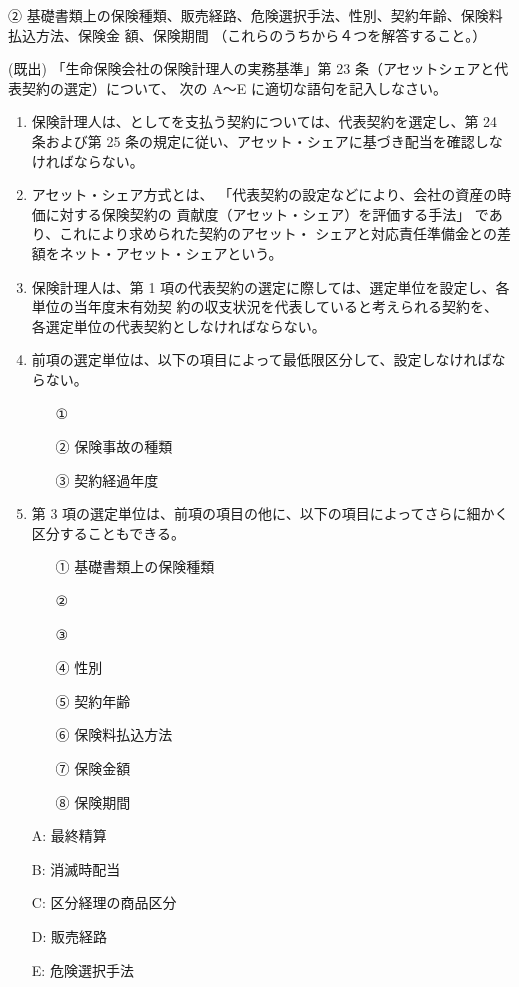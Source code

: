 \documentclass[report,gutter=10mm,fore-edge=10mm,uplatex,dvipdfmx]{jlreq}
\begin{document}
② 基礎書類上の保険種類、販売経路、危険選択手法、性別、契約年齢、保険料払込方法、保険金
額、保険期間 （これらのうちから４つを解答すること。）

 (既出)
「生命保険会社の保険計理人の実務基準」第 23 条（アセットシェアと代表契約の選定）について、
次の A～E に適切な語句を記入しなさい。


\begin{enumerate}
 \item 保険計理人は、としてを支払う契約については、代表契約を選定し、第 24 条および第 25 条の規定に従い、アセット・シェアに基づき配当を確認しなければならない。
 \item 
アセット・シェア方式とは、
「代表契約の設定などにより、会社の資産の時価に対する保険契約の
貢献度（アセット・シェア）を評価する手法」 であり、これにより求められた契約のアセット・
シェアと対応責任準備金との差額をネット・アセット・シェアという。
 \item 
保険計理人は、第 1 項の代表契約の選定に際しては、選定単位を設定し、各単位の当年度末有効契
約の収支状況を代表していると考えられる契約を、各選定単位の代表契約としなければならない。
 \item 
前項の選定単位は、以下の項目によって最低限区分して、設定しなければならない。
\begin{itemize}
 \item [①] 
 \item [②] 保険事故の種類
 \item [③] 契約経過年度
\end{itemize}
 \item 
第 3 項の選定単位は、前項の項目の他に、以下の項目によってさらに細かく区分することもできる。
\begin{itemize}
 \item [①]  基礎書類上の保険種類
 \item [②] 
\item [③] 
\item [④]  性別
\item [⑤]  契約年齢
\item [⑥]  保険料払込方法
\item [⑦]  保険金額
\item [⑧]  保険期間
\end{itemize}
\end{enumerate}
\answer{}

\begin{itemize}
\item [A: ] 最終精算
\item [B: ] 消滅時配当
\item [C: ] 区分経理の商品区分
\item [D: ] 販売経路
\item [E: ] 危険選択手法
\end{itemize}
\end{document}
